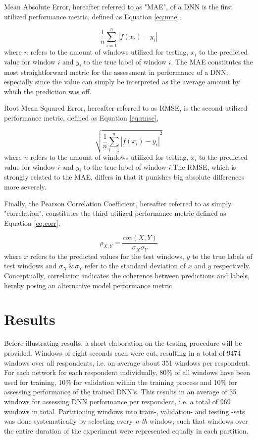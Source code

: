 \documentclass[12pt]{article}
\begin{document}
Mean Absolute Error, hereafter referred to as "MAE",  of a DNN is the first utilized performance metric, defined as Equation \ref{eq:mae},

\begin{equation}
\label{eq:mae}
\frac{1}{n} \sum^n_{i=1}|f(x_i)-y_i| 
\end{equation}
where $n$ refers to the amount of windows utilized for testing, $x_i$ to the predicted value for window $i$ and $y_i$ to the true label of window $i$.
The MAE constitutes the most straightforward metric for the assessment in performance of a DNN, especially since the value can simply be interpreted as the average amount by which the prediction was off.

Root Mean Squared Error, hereafter referred to as RMSE, is the second utilized performance metric, defined as Equation \ref{eq:rmse},

\begin{equation}
\label{eq:rmse}
\sqrt{{\frac{1}{n} \sum^n_{i=1}|f(x_i)-y_i|}^2}
\end{equation}
where $n$ refers to the amount of windows utilized for testing, $x_i$ to the predicted value for window $i$ and $y_i$ to the true label of window $i$.The RMSE, which is strongly related to the MAE, differs in that it punishes big absolute differences more severely. 

Finally, the Pearson Correlation Coefficient, hereafter referred to as simply "correlation", constitutes the third utilized performance metric defined as Equation  \ref{eq:corr},

\begin{equation}
\label{eq:corr}
\rho_{X,Y} = \frac{cov(X,Y)}{\sigma_{X} \sigma_{Y}}
\end{equation}
where $x$ refers to the predicted values for the test windows,  $y$ to the true labels of test windows and $\sigma_{X}\, \& \,\sigma_{Y}$ refer to the standard deviation of $x$ and $y$ respectively.  Conceptually, correlation indicates the coherence between predictions and labels, hereby posing an alternative model performance metric. 

\newpage
\section{Results}
Before illustrating results,  a short elaboration on the testing procedure will be provided.  Windows of eight seconds each were cut, resulting in a total of 9474 windows over all respondents, i.e. on average about 351 windows per respondent. For each network for each respondent individually,  80\% of all windows have been used for training, 10\% for validation within the training process and 10\% for assessing performance of the trained DNN's. This results in an average of 35 windows for assessing DNN performance per respondent, i.e. a total of 969 windows in total.  Partitioning windows into train-, validation- and testing -sets was done systematically by selecting every \textit{n-th} window, such that windows over the entire duration of the experiment were represented equally in each partition.
\end{document}
